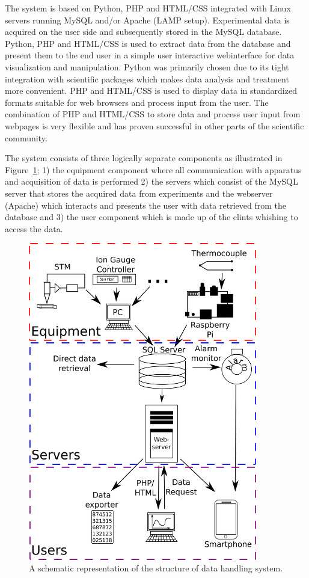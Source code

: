 The system is based on Python, PHP and HTML/CSS integrated with Linux servers
running MySQL and/or Apache (LAMP setup). Experimental data is acquired on the
user side and subsequently stored in the MySQL database. Python, PHP and
HTML/CSS is used to extract data from the database and present them to the end
user in a simple user interactive webinterface for data visualization and
manipulation. Python was primarily chosen due to its tight integration with
scientific packages which makes data analysis and treatment more
convenient\cite{Cahn2007}. PHP and HTML/CSS is used to display data in
standardized formats suitable for web browsers and process input from the user.
The combination of PHP and HTML/CSS to store data and process user input from
webpages is very flexible and has proven successful in other parts of the
scientific community\cite{Crane2008}.

The system consists of three logically separate components as illustrated in
Figure~\ref{fig:system_overview}; 1) the equipment component where all
communication with apparatus and acquisition of data is performed 2) the
servers which consist of the MySQL server that stores the acquired data from
experiments and the webserver (Apache) which interacts and presents the user with data
retrieved from the database and 3) the user component which is made up of the
clints whishing to access the data. \begin{figure}
 \begin{center}
 \includegraphics[width=10cm]{system_overview.png}
 \caption{
   A schematic representation of the structure of data handling system.
   \label{fig:system_overview}
 } 
 \end{center}
\end{figure}

